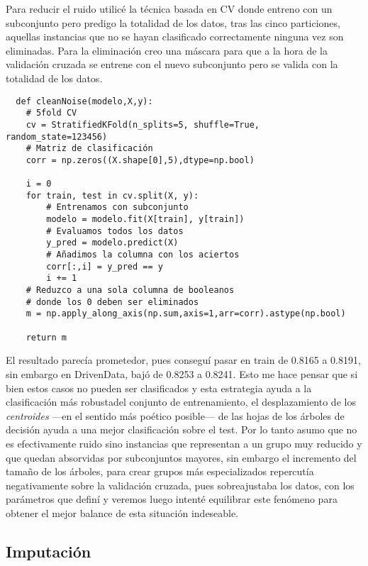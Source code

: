 \documentclass{article}
\begin{document}
Para reducir el ruido utilicé la técnica basada en CV donde entreno con un subconjunto pero predigo la totalidad de los datos, tras las cinco particiones, aquellas instancias que no se hayan clasificado correctamente ninguna vez son eliminadas. Para la eliminación creo una máscara para que a la hora de la validación cruzada se entrene con el nuevo subconjunto pero se valida con la totalidad de los datos.

\begin{verbatim}
  def cleanNoise(modelo,X,y):
    # 5fold CV
    cv = StratifiedKFold(n_splits=5, shuffle=True, random_state=123456)
    # Matriz de clasificación
    corr = np.zeros((X.shape[0],5),dtype=np.bool)
    
    i = 0
    for train, test in cv.split(X, y):
        # Entrenamos con subconjunto
        modelo = modelo.fit(X[train], y[train])
        # Evaluamos todos los datos
        y_pred = modelo.predict(X)
        # Añadimos la columna con los aciertos
        corr[:,i] = y_pred == y
        i += 1
    # Reduzco a una sola columna de booleanos 
    # donde los 0 deben ser eliminados
    m = np.apply_along_axis(np.sum,axis=1,arr=corr).astype(np.bool)

    return m
\end{verbatim}

El resultado parecía prometedor, pues conseguí pasar en train de 0.8165 a 0.8191, sin embargo en DrivenData, bajó de 0.8253 a 0.8241. Esto me hace pensar que si bien estos casos no pueden ser clasificados y esta estrategia ayuda a la clasificación más robustadel conjunto de entrenamiento, el desplazamiento de los \textit{centroides} ---en el sentido más poético posible--- de las hojas de los árboles de decisión ayuda a una mejor clasificación sobre el test. Por lo tanto asumo que no es efectivamente ruido sino instancias que representan a un grupo muy reducido y que quedan absorvidas por subconjuntos mayores, sin embargo el incremento del tamaño de los árboles, para crear grupos más especializados repercutía negativamente sobre la validación cruzada, pues sobreajustaba los datos, con los parámetros que definí y veremos luego intenté equilibrar este fenómeno para obtener el mejor balance de esta situación indeseable.


\subsection{Imputación}
\end{document}
